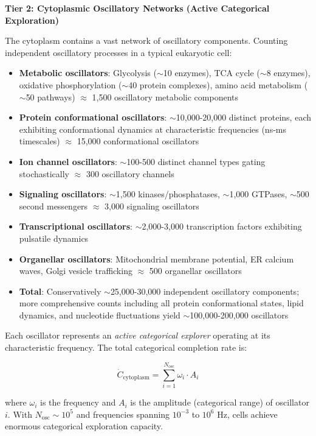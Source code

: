 \documentclass[11pt]{article}
\begin{document}
\textbf{Tier 2: Cytoplasmic Oscillatory Networks (Active Categorical Exploration)}

The cytoplasm contains a vast network of oscillatory components. Counting independent oscillatory processes in a typical eukaryotic cell:

\begin{itemize}
\item \textbf{Metabolic oscillators}: Glycolysis ($\sim$10 enzymes), TCA cycle ($\sim$8 enzymes), oxidative phosphorylation ($\sim$40 protein complexes), amino acid metabolism ($\sim$50 pathways) $\approx$ 1,500 oscillatory metabolic components
\item \textbf{Protein conformational oscillators}: $\sim$10,000-20,000 distinct proteins, each exhibiting conformational dynamics at characteristic frequencies (ns-ms timescales) $\approx$ 15,000 conformational oscillators
\item \textbf{Ion channel oscillators}: $\sim$100-500 distinct channel types gating stochastically $\approx$ 300 oscillatory channels
\item \textbf{Signaling oscillators}: $\sim$1,500 kinases/phosphatases, $\sim$1,000 GTPases, $\sim$500 second messengers $\approx$ 3,000 signaling oscillators
\item \textbf{Transcriptional oscillators}: $\sim$2,000-3,000 transcription factors exhibiting pulsatile dynamics
\item \textbf{Organellar oscillators}: Mitochondrial membrane potential, ER calcium waves, Golgi vesicle trafficking $\approx$ 500 organellar oscillators
\item \textbf{Total}: Conservatively $\sim$25,000-30,000 independent oscillatory components; more comprehensive counts including all protein conformational states, lipid dynamics, and nucleotide fluctuations yield $\sim$100,000-200,000 oscillators
\end{itemize}

Each oscillator represents an \textit{active categorical explorer} operating at its characteristic frequency. The total categorical completion rate is:

\begin{equation}
\dot{C}_{\text{cytoplasm}} = \sum_{i=1}^{N_{\text{osc}}} \omega_i \cdot A_i
\end{equation}

where $\omega_i$ is the frequency and $A_i$ is the amplitude (categorical range) of oscillator $i$. With $N_{\text{osc}} \sim 10^5$ and frequencies spanning $10^{-3}$ to $10^6$ Hz, cells achieve enormous categorical exploration capacity.
\end{document}
